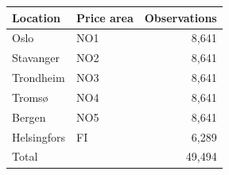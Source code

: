 \begin{tabular}{llr}
\toprule
Location & Price area & Observations \\
\midrule
Oslo & NO1 & 8,641 \\
Stavanger & NO2 & 8,641 \\
Trondheim & NO3 & 8,641 \\
Tromsø & NO4 & 8,641 \\
Bergen & NO5 & 8,641 \\
Helsingfors & FI & 6,289 \\
Total &  & 49,494 \\
\bottomrule
\end{tabular}
